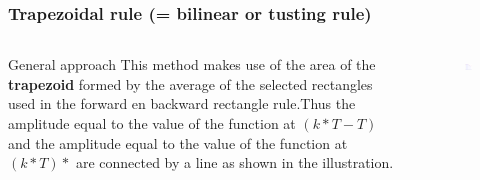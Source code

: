 \begin{frame}
	\frametitle{Trapezoidal rule (= bilinear or tusting rule)}
	
\begin{columns}
	\begin{column}{0.5\textwidth}
		\begin{block}{General approach}
			This method makes use of the area of the \textbf{trapezoid} formed by the average of the selected rectangles used in the forward en backward rectangle rule.Thus the amplitude equal to the value of the function at $(k*T - T)$ and the amplitude equal to the value of the function at $(k*T)*$ are connected by a line as shown in the illustration.
		\end{block}	
	\end{column}

	\begin{column}{0.5\textwidth}
		\begin{figure}
			\centering
			\includegraphics[width=1\linewidth]{Trapezium}
		\end{figure}
	\end{column}	
	
\end{columns}
\end{frame}

